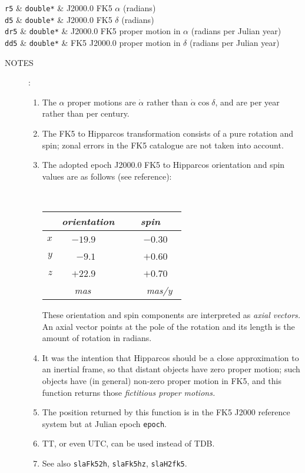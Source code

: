 \documentclass[11pt,fleqn,twoside]{article}
\renewcommand{\_}{{\tt\char'137}}     %
\newlength{\oldspacing}
\newcommand{\spec}[3]
{
  {\tt \mbox{#1}} & {\tt \mbox{#2}} & {#3}
}
\newcommand{\notes}[1]
{
  \goodbreak
  \setlength{\oldspacing}{\topsep}
  \setlength{\topsep}{0.3ex}
  \begin{description}
    \item[NOTES]:
        #1
  \end{description}
  \setlength{\topsep}{\oldspacing}
}
\begin{document}
{
 \spec{r5}{double*}{J2000.0 FK5 $\alpha$ (radians)} \\
 \spec{d5}{double*}{J2000.0 FK5 $\delta$ (radians)} \\
 \spec{dr5}{double*}{J2000.0 FK5 proper motion in $\alpha$
                              (radians per Julian year)} \\
 \spec{dd5}{double*}{FK5 J2000.0 proper motion in $\delta$
                              (radians per Julian year)}
}
\notes
{
 \begin{enumerate}
  \item The $\alpha$ proper motions are $\dot{\alpha}$ rather than
        $\dot{\alpha}\cos\delta$, and are per year rather than per century.
  \item The FK5 to Hipparcos
        transformation consists of a pure rotation and spin;
        zonal errors in the FK5 catalogue are not taken into account.
  \item The adopted epoch J2000.0 FK5 to Hipparcos orientation and spin
        values are as follows (see reference):
 
        \vspace{2ex}
 
        ~~~~~~~~~~~~
        \begin{tabular}{|r|r|r|} \hline
        &
        \multicolumn{1}{|c}{\it orientation} &
        \multicolumn{1}{|c|}{\it ~~~spin~~~} \\ \hline
        $x$ & $-19.9$~~~~ & ~$-0.30$~~ \\
        $y$ &  $-9.1$~~~~ & ~$+0.60$~~ \\
        $z$ & $+22.9$~~~~ & ~$+0.70$~~ \\ \hline
        & {\it mas}~~~~~ & ~{\it mas/y}~ \\ \hline
        \end{tabular}
 
        \vspace{3ex}
 
        These orientation and spin components are interpreted as
        {\it axial vectors.}  An axial vector points at the pole of
        the rotation and its length is the amount of rotation in radians.
  \item It was the intention that Hipparcos should be a close
        approximation to an inertial frame, so that distant objects
        have zero proper motion;  such objects have (in general)
        non-zero proper motion in FK5, and this function returns those
        {\it fictitious proper motions.}
  \item The position returned by this function is in the FK5 J2000
        reference system but at Julian epoch {\tt epoch}.
  \item TT, or even UTC, can be used instead of TDB.
  \item See also {\tt slaFk52h}, {\tt slaFk5hz}, {\tt slaH2fk5}.
 \end{enumerate}
}
\end{document}

